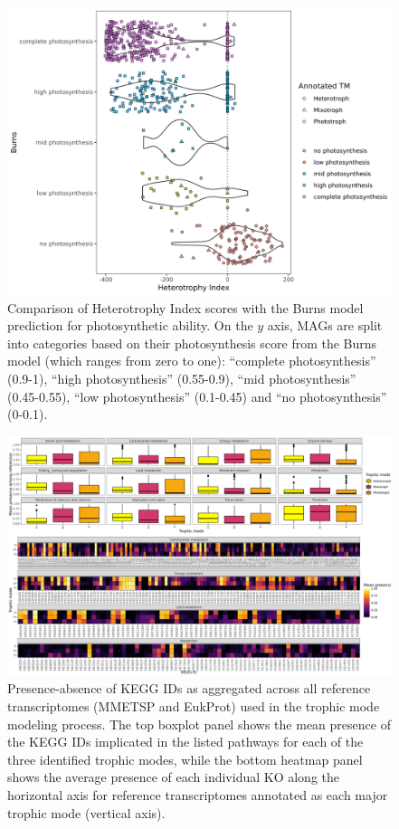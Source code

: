 \documentclass[12pt]{article}
\numberwithin{equation}{section}
\begin{document}
\begin{landscape}
    \begin{figure}
    \centering
    \includegraphics[width=0.95\columnwidth]{si-figures/burns_categories.png}
    \caption{Comparison of Heterotrophy Index scores with the Burns model prediction for photosynthetic ability. On the $y$ axis, MAGs are split into categories based on their photosynthesis score from the Burns model (which ranges from zero to one): ``complete photosynthesis'' (0.9-1), ``high photosynthesis'' (0.55-0.9), ``mid photosynthesis'' (0.45-0.55), ``low photosynthesis'' (0.1-0.45) and ``no photosynthesis'' (0-0.1).}
    \label{fig:burns-cats}
\end{figure}
\end{landscape}


\begin{landscape}
\begin{figure}
    \centering
    \includegraphics[width=0.95\columnwidth]{si-figures/KO_figure_trophy.png}
    \caption{Presence-absence of KEGG IDs as aggregated across all reference transcriptomes (MMETSP and EukProt) used in the trophic mode modeling process. The top boxplot panel shows the mean presence of the KEGG IDs implicated in the listed pathways for each of the three identified trophic modes, while the bottom heatmap panel shows the average presence of each individual KO along the horizontal axis for reference transcriptomes annotated as each major trophic mode (vertical axis).}
    \label{fig:ko-trophy}
\end{figure}
\end{landscape}
\end{document}
